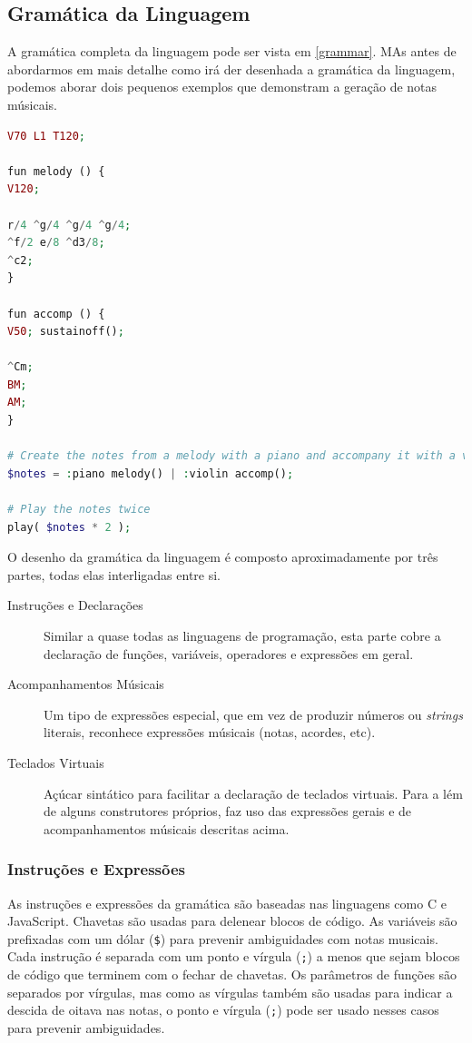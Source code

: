 \subsection{Gramática da Linguagem}
A gramática completa da linguagem pode ser vista em \ref{grammar}. MAs antes de abordarmos em mais detalhe como irá der desenhada a gramática da linguagem, podemos aborar dois pequenos exemplos que demonstram a geração de notas músicais.
\begin{lstlisting}[caption=Exemplo da sintaxe proposta da linguagem,language=PHP]
V70 L1 T120;

fun melody () {
V120;

r/4 ^g/4 ^g/4 ^g/4;
^f/2 e/8 ^d3/8; 
^c2;
}

fun accomp () {
V50; sustainoff();

^Cm;
BM; 
AM;
}

# Create the notes from a melody with a piano and accompany it with a violin in parallel
$notes = :piano melody() | :violin accomp();

# Play the notes twice
play( $notes * 2 );
\end{lstlisting}

O desenho da gramática da linguagem é composto aproximadamente por três partes, todas elas interligadas entre si.
\begin{description}
    \item[Instruções e Declarações] Similar a quase todas as linguagens de programação, esta parte cobre a declaração de funções, variáveis, operadores e expressões em geral.
    \item[Acompanhamentos Músicais] Um tipo de expressões especial, que em vez de produzir números ou \textit{strings} literais, reconhece expressões músicais (notas, acordes, etc).
    \item[Teclados Virtuais] Açúcar sintático para facilitar a declaração de teclados virtuais. Para a lém de alguns construtores próprios, faz uso das expressões gerais e de acompanhamentos músicais descritas acima.
\end{description}

\subsubsection{Instruções e Expressões}
As instruções e expressões da gramática são baseadas nas linguagens como C e JavaScript. Chavetas são usadas para delenear blocos de código. As variáveis são prefixadas com um dólar (\texttt{\$}) para prevenir ambiguidades com notas musicais. Cada instrução é separada com um ponto e vírgula (\texttt{;}) a menos que sejam blocos de código que terminem com o fechar de chavetas. Os parâmetros de funções são separados por vírgulas, mas como as vírgulas também são usadas para indicar a descida de oitava nas notas, o ponto e vírgula (\texttt{;}) pode ser usado nesses casos para prevenir ambiguidades.


